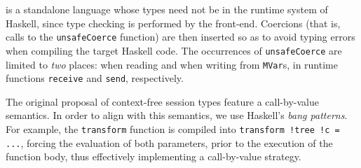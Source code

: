 
\freest{} is a standalone language whose types need not be in the
runtime system of Haskell, since type checking is performed by the
\freest{} front-end.
%
Coercions (that is, calls to the \lstinline|unsafeCoerce| function)
are then inserted so as to avoid typing errors when compiling the
target Haskell code. The occurrences of \lstinline|unsafeCoerce| are
limited to \emph{two} places: when reading and when writing from
\lstinline|MVar|s, in runtime functions \lstinline|receive| and
\lstinline|send|, respectively.

The original proposal of context-free session types feature a
call-by-value semantics. In order to align \freest{} with this
semantics, we use Haskell's \emph{bang patterns}. For example, the
\lstinline|transform| function is compiled into
\lstinline|transform !tree !c = ...|, forcing the evaluation of both
parameters, prior to the execution of the function body, thus
effectively implementing a call-by-value strategy.

